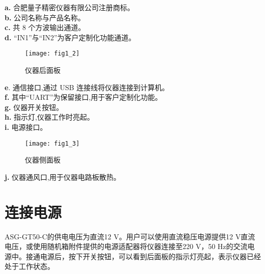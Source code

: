 \noindent \textbf{a.} 合肥量子精密仪器有限公司注册商标。\\
\textbf{b.} 公司名称与产品名称。\\
\textbf{c.} 共 8 个方波输出通道。\\
\textbf{d.} “IN1”与“IN2”为客户定制化功能通道。

\begin{figure}[ht]
\centering
\texttt{[image: fig1\_2]}
\caption{仪器后面板}\label{fig:fig1_2}
\end{figure}

\noindent \textbf{e}. 通信接口,通过 USB 连接线将仪器连接到计算机。\\
\textbf{f.} 其中“UART”为保留接口,用于客户定制化功能。\\
\textbf{g.} 仪器开关按钮。\\
\textbf{h.} 指示灯,仪器工作时亮起。\\
\textbf{i.} 电源接口。

\begin{figure}[ht]
\centering
\texttt{[image: fig1\_3]}
\caption{仪器侧面板}\label{fig:fig1_3}
\end{figure}
\noindent \textbf{j.} 仪器通风口,用于仪器电路板散热。


\section{\heiti 连接电源}
ASG-GT50-C的供电电压为直流12 V。用户可以使用直流稳压电源提供12 V直流电压，或使用随机箱附件提供的电源适配器将仪器连接至220 V，50 Hz的交流电源中。接通电源后，按下开关按钮，可以看到后面板的指示灯亮起，表示仪器已经处于工作状态。

